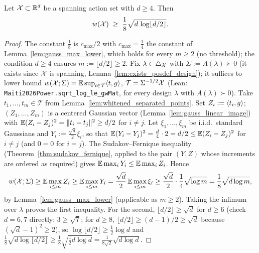 \begin{proposition}\label{prop:width_lower_sqrt_dlogd}
\leanok
{}
Let $\mathcal{X} \subset \mathbb{R}^d$ be a spanning action set with $d \ge 4$. Then
\[
  w(\mathcal{X}) \;\ge\; \frac18\sqrt{d\,\log\lfloor d/2\rfloor} .
\]
\end{proposition}

\begin{proof}
\leanok
{}
The constant $\frac18$ is $c_{\max}/2$ with $c_{\max} = \frac14$ the constant of
Lemma~\ref{lem:gauss_max_lower}, which holds for every $m \ge 2$ (no threshold); the
condition $d \ge 4$ ensures $m := \lfloor d/2\rfloor \ge 2$.
Fix $\lambda \in \triangle_{\mathcal{X}}$ with $\Sigma := A(\lambda) \succ 0$ (it exists since $\mathcal{X}$ is
spanning, Lemma~\ref{lem:exists_posdef_design}); it suffices to lower bound
$w(\mathcal{X};\Sigma) = \mathbb{E}\sup_{t\in\mathcal T}\langle t, g \rangle$, $\mathcal T = \Sigma^{-1/2}\mathcal{X}$
(Lean: \texttt{Maiti2026Power.sqrt\_log\_le\_gwMat}, for every design $\lambda$ with $A(\lambda)\succ0$).
Take $t_1,\dots,t_m \in \mathcal T$ from
Lemma~\ref{lem:whitened_separated_points}. Set $Z_i := \langle t_i, g \rangle$; $(Z_1,\dots,Z_m)$ is a
centered Gaussian vector (Lemma~\ref{lem:gauss_linear_image}) with
$\mathbb{E}(Z_i - Z_j)^2 = \lVert t_i-t_j \rVert^2 \ge d/2$ for $i \ne j$. Let $\xi_1,\dots,\xi_m$ be
i.i.d.\ standard Gaussians and $Y_i := \frac{\sqrt d}{2}\xi_i$, so that
$\mathbb{E}(Y_i-Y_j)^2 = \frac{d}{4}\cdot 2 = d/2 \le \mathbb{E}(Z_i-Z_j)^2$ for $i\ne j$ (and $0 = 0$ for
$i = j$). The Sudakov--Fernique inequality (Theorem~\ref{thm:sudakov_fernique}, applied to the
pair $(Y, Z)$ whose increments are ordered as required) gives
$\mathbb{E}\max_i Y_i \le \mathbb{E}\max_i Z_i$. Hence
\[
  w(\mathcal{X};\Sigma) \ge \mathbb{E}\max_{i\le m}Z_i \ge \mathbb{E}\max_{i\le m}Y_i
  = \frac{\sqrt d}{2}\,\mathbb{E}\max_{i\le m}\xi_i \ge \frac{\sqrt d}{2}\cdot\frac14\sqrt{\log m}
  = \frac18\sqrt{d\log m},
\]
by Lemma~\ref{lem:gauss_max_lower} (applicable as $m \ge 2$). Taking the infimum over
$\lambda$ proves the first inequality. For the second, $\lfloor d/2\rfloor \ge \sqrt d$ for
$d \ge 6$ (check $d = 6, 7$ directly: $3 \ge \sqrt 7$; for $d\ge 8$,
$\lfloor d/2\rfloor \ge (d-1)/2 \ge \sqrt d$ because $(\sqrt d - 1)^2 \ge 2$), so
$\log\lfloor d/2\rfloor \ge \frac12\log d$ and
$\frac18\sqrt{d\log\lfloor d/2\rfloor} \ge \frac18\sqrt{\tfrac12 d\log d} = \frac{1}{8\sqrt2}\sqrt{d\log d}$.
\end{proof}

